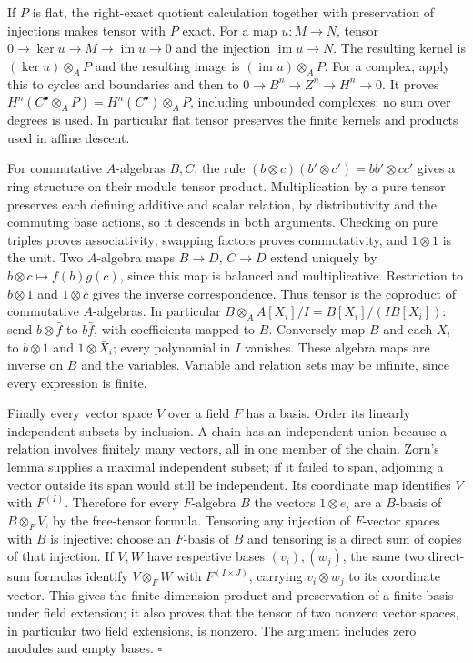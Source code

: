 \documentclass[11pt,a4paper,openany]{report}
\begin{document}
If \(P\) is flat, the right-exact quotient calculation together with preservation of injections makes tensor with \(P\) exact. For a map \(u:M\to N\), tensor \(0\to\ker u\to M\to\operatorname{im}u\to0\) and the injection \(\operatorname{im}u\to N\). The resulting kernel is \((\ker u)\otimes_A P\) and the resulting image is \((\operatorname{im}u)\otimes_A P\). For a complex, apply this to cycles and boundaries and then to \(0\to B^n\to Z^n\to H^n\to0\). It proves \(H^n(C^\bullet\otimes_A P)=H^n(C^\bullet)\otimes_A P\), including unbounded complexes; no sum over degrees is used. In particular flat tensor preserves the finite kernels and products used in affine descent.

For commutative \(A\)-algebras \(B,C\), the rule \((b\otimes c)(b'\otimes c')=bb'\otimes cc'\) gives a ring structure on their module tensor product. Multiplication by a pure tensor preserves each defining additive and scalar relation, by distributivity and the commuting base actions, so it descends in both arguments. Checking on pure triples proves associativity; swapping factors proves commutativity, and \(1\otimes1\) is the unit. Two \(A\)-algebra maps \(B\to D\), \(C\to D\) extend uniquely by \(b\otimes c\mapsto f(b)g(c)\), since this map is balanced and multiplicative. Restriction to \(b\otimes1\) and \(1\otimes c\) gives the inverse correspondence. Thus tensor is the coproduct of commutative \(A\)-algebras. In particular \(B\otimes_A A[X_i]/I=B[X_i]/(I B[X_i])\): send \(b\otimes\bar f\) to \(b\bar f\), with coefficients mapped to \(B\). Conversely map \(B\) and each \(X_i\) to \(b\otimes1\) and \(1\otimes\bar X_i\); every polynomial in \(I\) vanishes. These algebra maps are inverse on \(B\) and the variables. Variable and relation sets may be infinite, since every expression is finite.

Finally every vector space \(V\) over a field \(F\) has a basis. Order its linearly independent subsets by inclusion. A chain has an independent union because a relation involves finitely many vectors, all in one member of the chain. Zorn's lemma supplies a maximal independent subset; if it failed to span, adjoining a vector outside its span would still be independent. Its coordinate map identifies \(V\) with \(F^{(I)}\). Therefore for every \(F\)-algebra \(B\) the vectors \(1\otimes e_i\) are a \(B\)-basis of \(B\otimes_F V\), by the free-tensor formula. Tensoring any injection of \(F\)-vector spaces with \(B\) is injective: choose an \(F\)-basis of \(B\) and tensoring is a direct sum of copies of that injection. If \(V,W\) have respective bases \((v_i),(w_j)\), the same two direct-sum formulas identify \(V\otimes_F W\) with \(F^{(I\times J)}\), carrying \(v_i\otimes w_j\) to its coordinate vector. This gives the finite dimension product and preservation of a finite basis under field extension; it also proves that the tensor of two nonzero vector spaces, in particular two field extensions, is nonzero. The argument includes zero modules and empty bases. \(\square\)
\end{document}
